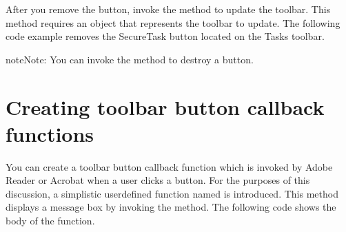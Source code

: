 \documentclass[letterpaper,12pt,english,openany,oneside]{sphinxmanual}
\begin{document}
After you remove the button, invoke the  method to update the toolbar. This method requires an  object that represents the toolbar to update. The following code example removes the SecureTask button located on the Tasks toolbar.

\begin{sphinxVerbatim}[commandchars=\\\{\}]
   
        
      

        
      

      
    

       

  
\end{sphinxVerbatim}

\begin{sphinxadmonition}{note}{Note:}
You can invoke the  method to destroy a button.
\end{sphinxadmonition}


\section{Creating toolbar button callback functions}
\label{\detokenize{Plugins_Toolbutton:creating-toolbar-button-callback-functions}}
You can create a toolbar button callback function which is invoked by Adobe Reader or Acrobat when a user clicks a button. For the purposes of this discussion, a simplistic user\sphinxhyphen{}defined function named  is introduced. This method displays a message box by invoking the  method. The following code shows the body of the  function.
\end{document}
